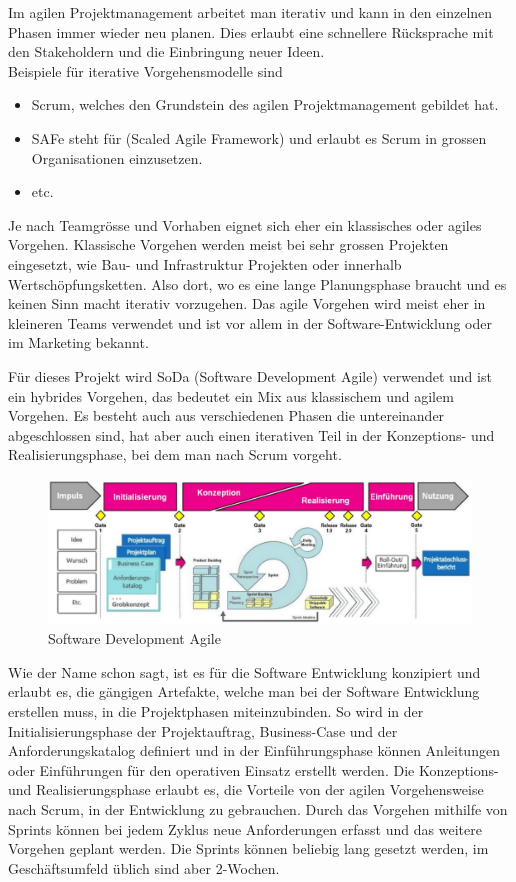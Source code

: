 \documentclass[a4paper, table]{article}
\begin{document}
Im agilen Projektmanagement arbeitet man iterativ und kann in den einzelnen Phasen immer wieder neu planen.
Dies erlaubt eine schnellere Rücksprache mit den Stakeholdern und die Einbringung neuer Ideen. \\
Beispiele für iterative Vorgehensmodelle sind
\begin{itemize}
    \item Scrum, welches den Grundstein des agilen Projektmanagement gebildet hat.
    \item SAFe steht für (Scaled Agile Framework) und erlaubt es Scrum in grossen Organisationen einzusetzen.
    \item etc. \autocite{noauthor_liste_2022}
\end{itemize}

Je nach Teamgrösse und Vorhaben eignet sich eher ein klassisches oder agiles Vorgehen.
Klassische Vorgehen werden meist bei sehr grossen Projekten eingesetzt, wie Bau- und Infrastruktur Projekten oder
innerhalb Wertschöpfungsketten. Also dort, wo es eine lange Planungsphase braucht und es keinen Sinn macht iterativ vorzugehen.
Das agile Vorgehen wird meist eher in kleineren Teams verwendet und ist vor allem in der Software-Entwicklung oder
im Marketing bekannt.
\newline

Für dieses Projekt wird SoDa (Software Development Agile) verwendet und ist ein hybrides Vorgehen,
das bedeutet ein Mix aus klassischem und agilem Vorgehen.
Es besteht auch aus verschiedenen Phasen die untereinander abgeschlossen sind,
hat aber auch einen iterativen Teil in der Konzeptions- und Realisierungsphase, bei dem man nach Scrum vorgeht.

\begin{figure}[h]
    \centering
    \includegraphics[width=1.0\textwidth]{img/SoDa.png}
    \caption{Software Development Agile}
    \label{fig:SoDa}
\end{figure}


Wie der Name schon sagt, ist es für die Software Entwicklung konzipiert und erlaubt es, die gängigen Artefakte,
welche man bei der Software Entwicklung erstellen muss, in die Projektphasen miteinzubinden.
So wird in der Initialisierungsphase der Projektauftrag, Business-Case und der Anforderungskatalog definiert und
in der Einführungsphase können Anleitungen oder Einführungen für den operativen Einsatz erstellt werden.
Die Konzeptions- und Realisierungsphase erlaubt es, die Vorteile von der agilen Vorgehensweise nach Scrum,
in der Entwicklung zu gebrauchen. Durch das Vorgehen mithilfe von Sprints können bei jedem Zyklus neue
Anforderungen erfasst und das weitere Vorgehen geplant werden. Die Sprints können beliebig lang gesetzt werden,
im Geschäftsumfeld üblich sind aber 2-Wochen.
\end{document}
